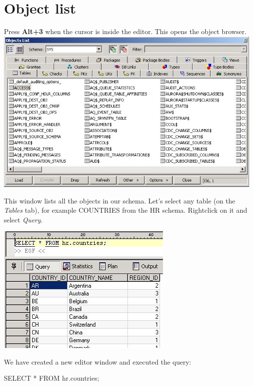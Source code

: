 \documentclass[a4paper,titlepage]{article}
\begin{document}
\section{Object list}
Press \textbf{Alt+3} when the cursor is inside the editor. This opens the object browser.\\
\includegraphics[bb=0 0 683 419,width=\textwidth]{02objview00}

This window lists all the objects in our schema. Let's select any table (on the \emph{Tables} tab), for example COUNTRIES from the HR schema. Rightclick on it and select \emph{Query}.\\
\begin{center}
\includegraphics[bb=0 0 327 240,scale=.7]{02objview02}
\end{center}

We have created a new editor window and executed the query:
\begin{center}
SELECT * FROM hr.countries;
\end{center}
\end{document}
